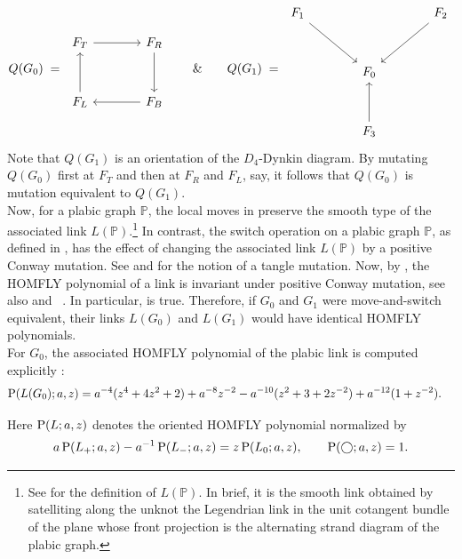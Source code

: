 \[
Q(G_0)\;=\;
\begin{tikzcd}[row sep=3.2em,column sep=3.8em]
F_T \arrow[r] & F_R \arrow[d] \\
F_L \arrow[u] & F_B \arrow[l]
\end{tikzcd}
\quad\quad\&\quad\quad
Q(G_1)\;=\;
\begin{tikzcd}[row sep=3.2em,column sep=3.8em]
F_1 \arrow[dr] & & F_2 \arrow[dl] \\
& F_0 & \\
& F_3 \arrow[u] &
\end{tikzcd}
\]
Note that $Q(G_1)$ is an orientation of the $D_4$-Dynkin diagram. By mutating $Q(G_0)$ first at $F_T$ and then at $F_R$ and $F_L$, say, it follows that $Q(G_0)$ is mutation equivalent to $Q(G_1)$.\\

Now, for a plabic graph $\mathbb{P}$, the local moves in \cite[Definition 6.2]{FPST} preserve the smooth type of the associated link $L(\mathbb{P})$.\footnote{See \cite[Section 9]{FPST} for the definition of $L(\mathbb{P})$. In brief, it is the smooth link obtained by satelliting along the unknot the Legendrian link in the unit cotangent bundle of the plane whose front projection is the alternating strand diagram of the plabic graph.} In contrast, the switch operation on a plabic graph $\mathbb{P}$, as defined in \cite[Definition 6.15]{FPST}, has the effect of changing the associated link $L(\mathbb{P})$ by a positive Conway mutation. See \cite{Conway1970} and \cite[Section~1]{Morton2015} for the notion of a tangle mutation. Now, by \cite[Statement~11]{Hoste1986}, the HOMFLY polynomial of a link is invariant under positive Conway
mutation, see also \cite[Proposition~11]{LickorishMillett1987} and ~\cite{FreydEtAl1985}. In particular, \cite[Conjecture 9.6]{GL} is true. Therefore, if $G_0$ and $G_1$ were move-and-switch equivalent, their links $L(G_0)$ and $L(G_1)$ would have identical HOMFLY polynomials.\\

For $G_0$, the associated HOMFLY polynomial of the plabic link is computed explicitly \cite[Section~9.3]{GL}:
\begin{equation}\label{eq:P0}
\begin{aligned}
\operatorname{P}(L(G_0);a,z)
={}&a^{-4}(z^4+4z^2+2)+a^{-8}z^{-2}-a^{-10}(z^2+3+2z^{-2})
+a^{-12}(1+z^{-2}).
\end{aligned}
\end{equation}

\noindent Here $\operatorname{P}(L;a,z)$ denotes the oriented HOMFLY polynomial normalized by
\begin{equation}\label{eq:homfly-skein}
a\operatorname{P}(L_+;a,z)-a^{-1}\operatorname{P}(L_-;a,z)=z\operatorname{P}(L_0;a,z),
\qquad
\operatorname{P}(\bigcirc;a,z)=1.
\end{equation}

